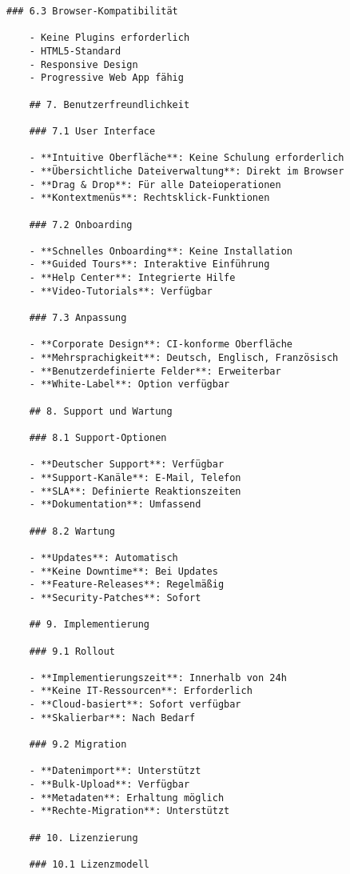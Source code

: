 \begin{Verbatim}[breaklines=true]
    ### 6.3 Browser-Kompatibilität
    
    - Keine Plugins erforderlich
    - HTML5-Standard
    - Responsive Design
    - Progressive Web App fähig
    
    ## 7. Benutzerfreundlichkeit
    
    ### 7.1 User Interface
    
    - **Intuitive Oberfläche**: Keine Schulung erforderlich
    - **Übersichtliche Dateiverwaltung**: Direkt im Browser
    - **Drag & Drop**: Für alle Dateioperationen
    - **Kontextmenüs**: Rechtsklick-Funktionen
    
    ### 7.2 Onboarding
    
    - **Schnelles Onboarding**: Keine Installation
    - **Guided Tours**: Interaktive Einführung
    - **Help Center**: Integrierte Hilfe
    - **Video-Tutorials**: Verfügbar
    
    ### 7.3 Anpassung
    
    - **Corporate Design**: CI-konforme Oberfläche
    - **Mehrsprachigkeit**: Deutsch, Englisch, Französisch
    - **Benutzerdefinierte Felder**: Erweiterbar
    - **White-Label**: Option verfügbar
    
    ## 8. Support und Wartung
    
    ### 8.1 Support-Optionen
    
    - **Deutscher Support**: Verfügbar
    - **Support-Kanäle**: E-Mail, Telefon
    - **SLA**: Definierte Reaktionszeiten
    - **Dokumentation**: Umfassend
    
    ### 8.2 Wartung
    
    - **Updates**: Automatisch
    - **Keine Downtime**: Bei Updates
    - **Feature-Releases**: Regelmäßig
    - **Security-Patches**: Sofort
    
    ## 9. Implementierung
    
    ### 9.1 Rollout
    
    - **Implementierungszeit**: Innerhalb von 24h
    - **Keine IT-Ressourcen**: Erforderlich
    - **Cloud-basiert**: Sofort verfügbar
    - **Skalierbar**: Nach Bedarf
    
    ### 9.2 Migration
    
    - **Datenimport**: Unterstützt
    - **Bulk-Upload**: Verfügbar
    - **Metadaten**: Erhaltung möglich
    - **Rechte-Migration**: Unterstützt
    
    ## 10. Lizenzierung
    
    ### 10.1 Lizenzmodell
    

\end{Verbatim}
